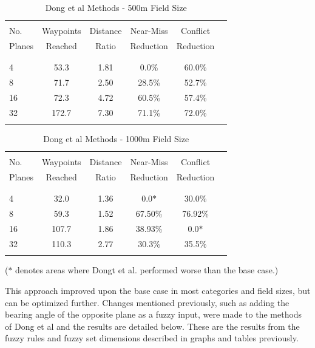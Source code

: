 \documentclass[10pt, conference, compsocconf]{IEEEtran}
\begin{document}
\begin{table}[position here]
\centering
\caption{Dong et al Methods - 500m Field Size}
\begin{tabular}{l c c c c c}
\hline
\hline
\\
No.  & Waypoints & Distance & Near-Miss & Conflict \\
Planes& Reached & Ratio & Reduction & Reduction \\
\\
\hline
\hline
\\
4 & 53.3 & 1.81 & 0.0\% & 60.0\% \\
8& 71.7 & 2.50 & 28.5\% & 52.7\% \\
16 &  72.3 & 4.72 & 60.5\% & 57.4\% \\
32 & 172.7 & 7.30 & 71.1\% & 72.0\% \\
\\
\hline
\end{tabular}
\label{tab:cc500}
\end{table}

\begin{table}[position here]
\centering
\caption{Dong et al Methods - 1000m Field Size}
\begin{tabular}{l c c c c c}
\hline
\hline
\\
No.  & Waypoints & Distance & Near-Miss & Conflict \\
Planes& Reached & Ratio & Reduction & Reduction \\\\
\hline
\hline
\\
4 & 32.0 & 1.36 & 0.0$\ast$ & 30.0$\%$ \\
8 & 59.3 & 1.52 & 67.50$\%$ & 76.92$\%$ \\
16 & 107.7 & 1.86 & 38.93$\%$ & 0.0$\ast$ \\
32 & 110.3 & 2.77 & 30.3\% & 35.5\% \\
\\
\hline
\end{tabular}
\label{tab:cc1000}
\end{table}
\small($\ast$ denotes areas where Dongt et al. performed worse than the base case.)

This approach improved upon the base case in most categories and field sizes, but can be optimized further. Changes mentioned previously, such as adding the bearing angle of the opposite plane as a fuzzy input, were made to the methods of Dong et al and the results are detailed below. These are the results from the fuzzy rules and fuzzy set dimensions described in graphs and tables previously.
\end{document}
